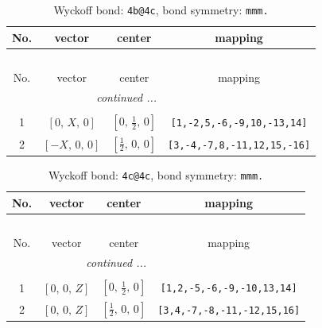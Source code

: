 \documentclass[fleqn,8pt]{jsarticle}
\begin{document}
\renewcommand{\arraystretch}{1.2}
\begin{longtable}{cccc}
\caption{Wyckoff bond: {\tt 4b@4c}, bond symmetry: {\tt mmm.}}
 \\
 \hline \hline
No. & vector & center & mapping \\ \hline \endfirsthead

\multicolumn{3}{l}{\tablename\ \thetable{}} \\
 \hline \hline
No. & vector & center & mapping \\ \hline \endhead

 \hline \hline
\multicolumn{3}{r}{\footnotesize\it continued ...} \\ \endfoot

 \hline \hline
\multicolumn{3}{r}{} \\ \endlastfoot

1 & $\left[ 0,\, X,\, 0 \right]$ & $\left[ 0,\, \frac{1}{2},\, 0 \right]$ & {\tt [1,-2,5,-6,-9,10,-13,14]} \\ \hline
2 & $\left[ - X,\, 0,\, 0 \right]$ & $\left[ \frac{1}{2},\, 0,\, 0 \right]$ & {\tt [3,-4,-7,8,-11,12,15,-16]} \\
\end{longtable}
\renewcommand{\arraystretch}{1.2}
\begin{longtable}{cccc}
\caption{Wyckoff bond: {\tt 4c@4c}, bond symmetry: {\tt mmm.}}
 \\
 \hline \hline
No. & vector & center & mapping \\ \hline \endfirsthead

\multicolumn{3}{l}{\tablename\ \thetable{}} \\
 \hline \hline
No. & vector & center & mapping \\ \hline \endhead

 \hline \hline
\multicolumn{3}{r}{\footnotesize\it continued ...} \\ \endfoot

 \hline \hline
\multicolumn{3}{r}{} \\ \endlastfoot

1 & $\left[ 0,\, 0,\, Z \right]$ & $\left[ 0,\, \frac{1}{2},\, 0 \right]$ & {\tt [1,2,-5,-6,-9,-10,13,14]} \\ \hline
2 & $\left[ 0,\, 0,\, Z \right]$ & $\left[ \frac{1}{2},\, 0,\, 0 \right]$ & {\tt [3,4,-7,-8,-11,-12,15,16]} \\
\end{longtable}
\renewcommand{\arraystretch}{1.2}
\end{document}
